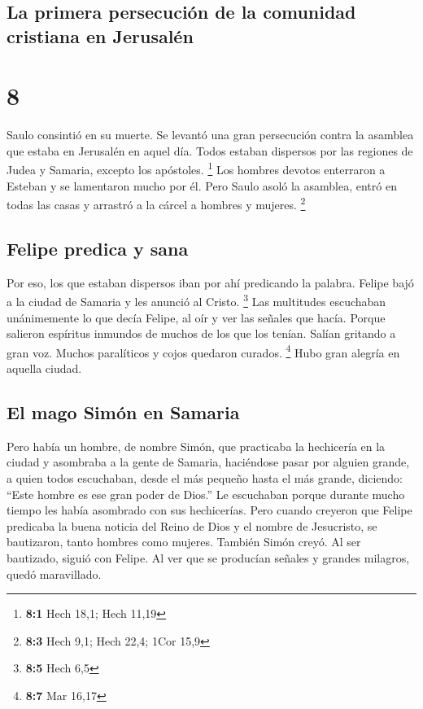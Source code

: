 \begin{paracol}{2}
{\subsection{La primera persecución de la comunidad cristiana en
Jerusalén}\label{la-primera-persecuciuxf3n-de-la-comunidad-cristiana-en-jerusaluxe9n}}

\hypertarget{section-14}{%
\section{8}\label{section-14}}

 Saulo consintió en su muerte. Se levantó una gran
persecución contra la asamblea que estaba en Jerusalén en aquel día.
Todos estaban dispersos por las regiones de Judea y Samaria, excepto los
apóstoles. \footnote{\textbf{8:1} Hech 18,1; Hech 11,19} 
Los hombres devotos enterraron a Esteban y se lamentaron mucho por él.
 Pero Saulo asoló la asamblea, entró en todas las casas y
arrastró a la cárcel a hombres y mujeres. \footnote{\textbf{8:3} Hech
  9,1; Hech 22,4; 1Cor 15,9}

\hypertarget{felipe-predica-y-sana}{%
\subsection{Felipe predica y sana}\label{felipe-predica-y-sana}}

 Por eso, los que estaban dispersos iban por ahí
predicando la palabra.  Felipe bajó a la ciudad de Samaria
y les anunció al Cristo. \footnote{\textbf{8:5} Hech 6,5} 
Las multitudes escuchaban unánimemente lo que decía Felipe, al oír y ver
las señales que hacía.  Porque salieron espíritus inmundos
de muchos de los que los tenían. Salían gritando a gran voz. Muchos
paralíticos y cojos quedaron curados. \footnote{\textbf{8:7} Mar 16,17}
 Hubo gran alegría en aquella ciudad.

\hypertarget{el-mago-simuxf3n-en-samaria}{%
\subsection{El mago Simón en
Samaria}\label{el-mago-simuxf3n-en-samaria}}

 Pero había un hombre, de nombre Simón, que practicaba la
hechicería en la ciudad y asombraba a la gente de Samaria, haciéndose
pasar por alguien grande,  a quien todos escuchaban,
desde el más pequeño hasta el más grande, diciendo: ``Este hombre es ese
gran poder de Dios.''  Le escuchaban porque durante mucho
tiempo les había asombrado con sus hechicerías.  Pero
cuando creyeron que Felipe predicaba la buena noticia del Reino de Dios
y el nombre de Jesucristo, se bautizaron, tanto hombres como mujeres.
 También Simón creyó. Al ser bautizado, siguió con
Felipe. Al ver que se producían señales y grandes milagros, quedó
maravillado.


\end{paracol}
